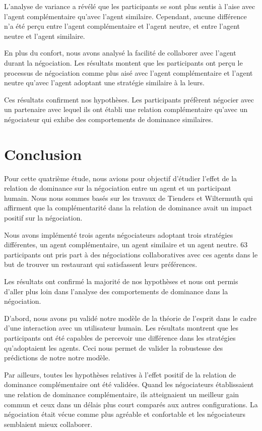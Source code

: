 	L'analyse de variance a révélé que les participants se sont plus sentis à l'aise avec l'agent complémentaire qu'avec l'agent similaire. Cependant, aucune différence n'a été perçu entre l'agent complémentaire et l'agent neutre, et entre l'agent neutre et l'agent similaire.
	
	En plus du confort, nous avons analysé la facilité de collaborer avec l'agent durant la négociation. Les résultats montent que les participants ont perçu le processus de négociation comme plus aisé avec l'agent complémentaire et l'agent neutre qu'avec l'agent adoptant une stratégie similaire à la leurs. 
	
	Ces résultats confirment nos hypothèses. Les participants préfèrent négocier avec un partenaire avec lequel ils ont établi une relation complémentaire qu'avec un négociateur qui exhibe des comportements de dominance similaires. 
	
	
	\section{Conclusion}
	Pour cette quatrième étude, nous avions pour objectif d'étudier l'effet de la relation de dominance sur la négociation entre un agent et un participant humain. Nous nous sommes basés sur les travaux de Tienders et Wiltermuth \cite{wiltermuth2009benefits,tiedens2003power} qui affirment que la complémentarité dans la relation de dominance avait un impact positif sur la négociation. 
	
	Nous avons implémenté trois agents négociateurs adoptant trois stratégies différentes, un agent complémentaire, un agent similaire et un agent neutre. 
	63 participants ont pris part à  des négociations collaboratives avec ces agents dans le but de trouver un restaurant qui satisfassent leurs préférences. 
	
	Les résultats ont confirmé la majorité de nos hypothèses et nous ont permis d'aller plus loin dans l'analyse des comportements de dominance dans la négociation. 
	
	D'abord, nous avons pu validé notre modèle de la théorie de l'esprit dans le cadre d'une interaction avec un utilisateur humain. 
	Les résultats montrent que les participants ont été capables de percevoir une différence dans les stratégies qu'adoptaient les agents. Ceci nous permet de valider la robustesse des prédictions de notre notre modèle. 
	
	Par ailleurs, toutes les hypothèses relatives à l'effet positif de la relation de dominance complémentaire ont été validées. Quand les négociateurs établissaient une relation de dominance complémentaire, ils atteignaient un meilleur gain commun et ceux dans un délais plus court comparés aux autres configurations. La négociation était vécue comme plus agréable et confortable et les négociateurs semblaient mieux collaborer. 
	

